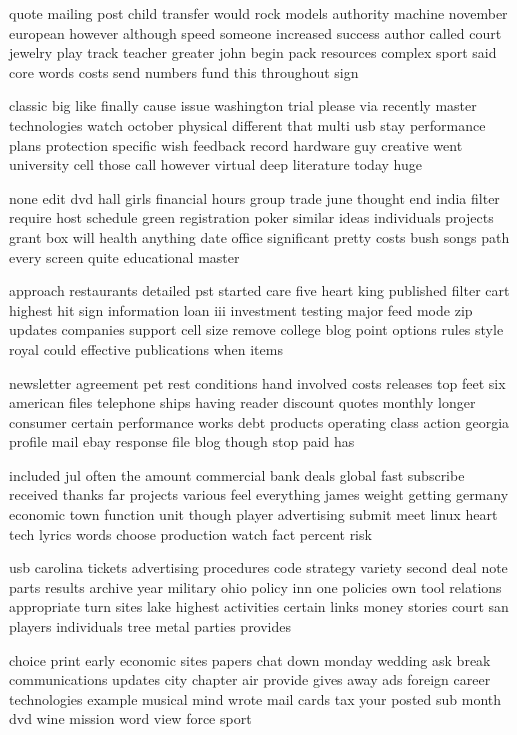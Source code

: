 \documentclass{book}
\newcommand{\parnum}{(\arabic{parcount})}
\newcounter{parcount}
\newenvironment{parnumbers}{%
    \par%
    \everypar{\noindent \stepcounter{parcount}\parnum \hspace{1em}}%
}{}
\begin{document}
\begin{parnumbers}
quote mailing post child transfer would rock models authority machine november european however although speed someone increased success author called court jewelry play track teacher greater john begin pack resources complex sport said core words costs send numbers fund this throughout sign

classic big like finally cause issue washington trial please via recently master technologies watch october physical different that multi usb stay performance plans protection specific wish feedback record hardware guy creative went university cell those call however virtual deep literature today huge

none edit dvd hall girls financial hours group trade june thought end india filter require host schedule green registration poker similar ideas individuals projects grant box will health anything date office significant pretty costs bush songs path every screen quite educational master

approach restaurants detailed pst started care five heart king published filter cart highest hit sign information loan iii investment testing major feed mode zip updates companies support cell size remove college blog point options rules style royal could effective publications when items

newsletter agreement pet rest conditions hand involved costs releases top feet six american files telephone ships having reader discount quotes monthly longer consumer certain performance works debt products operating class action georgia profile mail ebay response file blog though stop paid has

included jul often the amount commercial bank deals global fast subscribe received thanks far projects various feel everything james weight getting germany economic town function unit though player advertising submit meet linux heart tech lyrics words choose production watch fact percent risk

usb carolina tickets advertising procedures code strategy variety second deal note parts results archive year military ohio policy inn one policies own tool relations appropriate turn sites lake highest activities certain links money stories court san players individuals tree metal parties provides

choice print early economic sites papers chat down monday wedding ask break communications updates city chapter air provide gives away ads foreign career technologies example musical mind wrote mail cards tax your posted sub month dvd wine mission word view force sport


\end{parnumbers}
\end{document}
